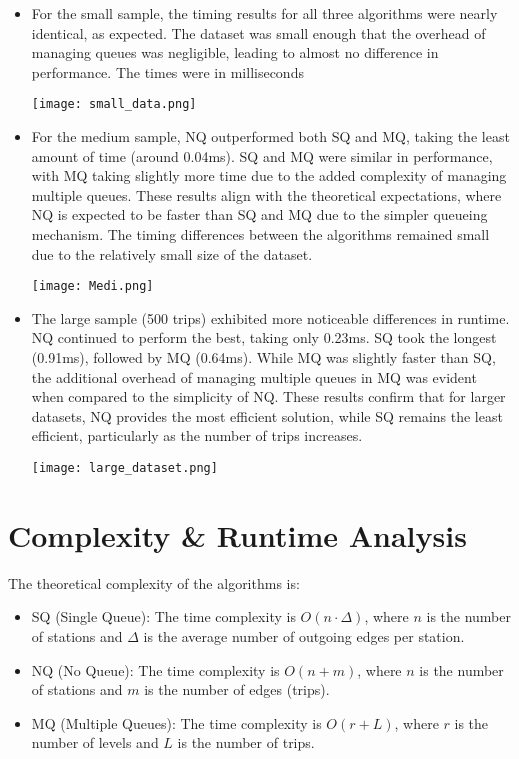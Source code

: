 \documentclass[12pt]{article}
\begin{document}
\begin{itemize}
    \item For the small sample, the timing results for all three algorithms were nearly identical, as expected. The dataset was small enough that the overhead of managing queues was negligible, leading to almost no difference in performance. The times were in milliseconds
    
    \texttt{[image: small\_data.png]}
    
   

    \item For the medium sample, NQ outperformed both SQ and MQ, taking the least amount of time (around 0.04ms). SQ and MQ were similar in performance, with MQ taking slightly more time due to the added complexity of managing multiple queues. These results align with the theoretical expectations, where NQ is expected to be faster than SQ and MQ due to the simpler queueing mechanism. The timing differences between the algorithms remained small due to the relatively small size of the dataset.

     \texttt{[image: Medi.png]}

\item The large sample (500 trips) exhibited more noticeable differences in runtime. NQ continued to perform the best, taking only 0.23ms. SQ took the longest (0.91ms), followed by MQ (0.64ms). While MQ was slightly faster than SQ, the additional overhead of managing multiple queues in MQ was evident when compared to the simplicity of NQ. These results confirm that for larger datasets, NQ provides the most efficient solution, while SQ remains the least efficient, particularly as the number of trips increases.

\texttt{[image: large\_dataset.png]}
\end{itemize}






\section{Complexity \& Runtime Analysis}
The theoretical complexity of the algorithms is:
\begin{itemize}
    \item SQ (Single Queue): The time complexity is \(O(n \cdot \Delta)\), where \(n\) is the number of stations and \(\Delta\) is the average number of outgoing edges per station.
    \item NQ (No Queue): The time complexity is \(O(n + m)\), where \(n\) is the number of stations and \(m\) is the number of edges (trips).
    \item MQ (Multiple Queues): The time complexity is \(O(r + L)\), where \(r\) is the number of levels and \(L\) is the number of trips.
\end{itemize}
\end{document}
